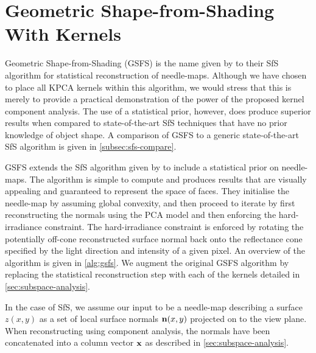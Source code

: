 \section{Geometric Shape-from-Shading With Kernels}\label{sec:singl_img_gsfs}
Geometric Shape-from-Shading (GSFS) is the name given by 
\citet{RefWorks:86,RefWorks:90} to their SfS algorithm for statistical 
reconstruction of needle-maps. Although we have chosen to place all KPCA
kernels within this algorithm, we would stress that this is merely to provide a
practical demonstration of the power of the proposed kernel component analysis.
The use of a statistical prior, however, does produce superior results when
compared to state-of-the-art SfS techniques that have no prior knowledge of
object shape. A comparison of GSFS to a generic state-of-the-art SfS algorithm
is given in \cref{subsec:sfs-compare}.

GSFS extends the SfS algorithm given by \citet{RefWorks:252} to include a 
statistical prior on needle-maps. The algorithm
is simple to compute and produces results that are visually appealing and
guaranteed to represent the space of faces. They initialise the needle-map by
assuming global convexity, and then proceed to iterate by first reconstructing
the normals using the PCA model and then enforcing the hard-irradiance
constraint. The hard-irradiance constraint is enforced by rotating the
potentially off-cone reconstructed surface normal back onto the reflectance cone
specified by the light direction and intensity of a given pixel. An overview of
the algorithm is given in \cref{alg:gsfs}. We augment the original GSFS
algorithm by replacing the statistical reconstruction step with each of the
kernels detailed in \cref{sec:subspace-analysis}.

In the case of SfS, we assume our input to be a needle-map describing a surface
$z(x, y)$ as a set of local surface normals $\boldsymbol{\mathbf{n}}(x, y)$ projected on
to the view plane. When reconstructing using component analysis, the normals
have been concatenated into a column vector $\boldsymbol{\mathbf{x}}$ as described in
\cref{sec:subspace-analysis}.

